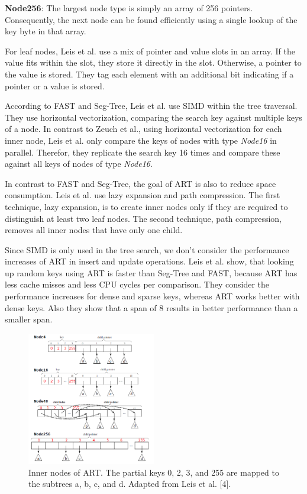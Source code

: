 \documentclass[conference]{IEEEtran}
\begin{document}
\textbf{Node256}: The largest node type is simply an array of 256 pointers. Consequently, the next node can be found efficiently using a single lookup of the key byte in that array. 

For leaf nodes, Leis et al. use a mix of pointer and value slots in an array. If the value fits within the slot, they store it directly in the slot. Otherwise, a pointer to the value is stored. They tag each element with an additional bit indicating if a pointer or a value is stored.

According to FAST and Seg-Tree, Leis et al. use SIMD within the tree traversal. They use horizontal vectorization, comparing the search key against multiple keys of a node. In contrast to Zeuch et al., using horizontal vectorization for each inner node, Leis et al. only compare the keys of nodes with type \emph{Node16} in parallel. Therefor, they replicate the search key 16 times and compare these against all keys of nodes of type \emph{Node16}.

In contrast to FAST and Seg-Tree, the goal of ART is also to reduce space consumption. Leis et al. use lazy expansion and path compression. The first technique, lazy expansion, is to create inner nodes only if they are required to distinguish at least two leaf nodes. The second technique, path compression, removes all inner nodes that have only one child.

Since SIMD is only used in the tree search, we don't consider the performance increases of ART in insert and update operations. Leis et al. show, that looking up random keys using ART is faster than Seg-Tree and FAST, because ART has less cache misses and less CPU cycles per comparison. They consider the performance increases for dense and sparse keys, whereas ART works better with dense keys. Also they show that a span of 8 results in better performance than a smaller span. 

\begin{figure}
	\includegraphics[width=0.5\textwidth]{figure_4.png}
	\caption{Inner nodes of ART. The partial keys 0, 2, 3, and 255 are mapped to the subtrees a, b, c, and d. Adapted from Leis et al. [4].}
	\label{fig}
\end{figure}
\end{document}
